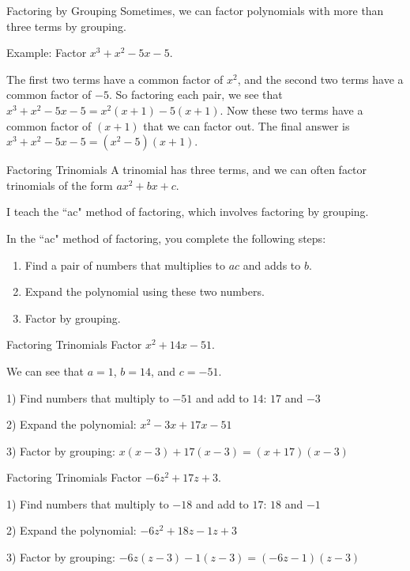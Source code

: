 \documentclass{beamer}
\newcommand{\fp}[1]{\left({#1}\right)} %
\begin{document}
\begin{frame}[t]{Factoring by Grouping}
Sometimes, we can factor polynomials with more than three terms by grouping.

Example: Factor $x^3 + x^2 - 5x - 5$.

\pause

The first two terms have a common factor of $x^2$, and the second two terms have a common factor of $-5$. So factoring each pair, we see that $x^3 + x^2 - 5x - 5 = x^2(x + 1) - 5(x + 1)$. \pause Now these two terms have a common factor of $(x + 1)$ that we can factor out. \pause The final answer is $x^3 + x^2 - 5x -5 = \fp{x^2 - 5}(x+1)$. 
\end{frame}

\begin{frame}[t]{Factoring Trinomials}
A trinomial has three terms, and we can often factor trinomials of the form $ax^2 + bx + c$.

I teach the ``ac" method of factoring, which involves factoring by grouping. \pause

In the ``ac" method of factoring, you complete the following steps: \begin{enumerate}[1)]
	\item<3-> Find a pair of numbers that multiplies to $ac$ and adds to $b$.
	\item<4-> Expand the polynomial using these two numbers.
	\item<5> Factor by grouping.
\end{enumerate}
\end{frame}

\begin{frame}[t]{Factoring Trinomials}
Factor $x^2 + 14x - 51$.

We can see that $a = 1$, $b = 14$, and $c = -51$.

\pause

1) Find numbers that multiply to $-51$ and add to $14$: $17$ and $-3$

\pause

2) Expand the polynomial: $x^2 - 3x + 17x - 51$

\pause

3) Factor by grouping: $x(x-3) + 17(x-3) = (x+17)(x-3)$
\end{frame}

\begin{frame}[t]{Factoring Trinomials}
Factor $-6z^2 + 17z + 3$.

1) Find numbers that multiply to $-18$ and add to $17$: $18$ and $-1$

\pause

2) Expand the polynomial: $-6z^2 + 18z - 1z + 3$

\pause

3) Factor by grouping: $-6z(z - 3) - 1(z-3) = (-6z - 1)(z-3)$ 
\end{frame}
\end{document}
